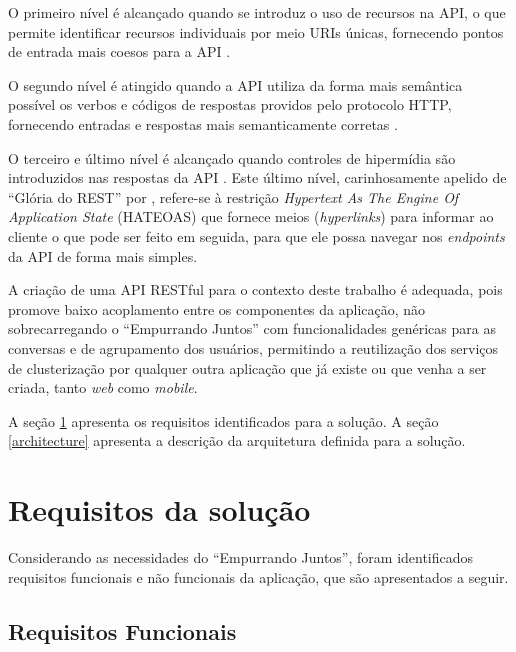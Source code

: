       O primeiro nível é alcançado quando se introduz o uso de recursos na API,
      o que permite identificar recursos individuais por meio URIs únicas,
      fornecendo pontos de entrada mais coesos para a API \cite{fowler10} \cite{richardson09}.
      
      O segundo nível é atingido quando a API utiliza da forma mais semântica possível
      os verbos e códigos de respostas providos pelo protocolo HTTP,
      fornecendo entradas e respostas mais semanticamente corretas \cite{fowler10} \cite{richardson09}.
      
      O terceiro e último nível é alcançado quando controles de hipermídia
      são introduzidos nas respostas da API \cite{fowler10} \cite{richardson09}.
      Este último nível, carinhosamente apelido de ``Glória do REST'' por ,
      refere-se à restrição \textit{Hypertext As The Engine Of Application State} (HATEOAS) 
      que fornece meios (\textit{hyperlinks}) para informar ao cliente o que pode ser feito em seguida,
      para que ele possa navegar nos \textit{endpoints} da API de forma mais simples.
      
  A criação de uma API RESTful para o contexto deste trabalho é adequada, pois promove baixo acoplamento
  entre os componentes da aplicação, não sobrecarregando o ``Empurrando Juntos'' com funcionalidades genéricas
  para as conversas e de agrupamento dos usuários,
  permitindo a reutilização dos serviços de clusterização por qualquer
  outra aplicação que já existe ou que venha a ser criada, tanto \textit{web} como \textit{mobile}.
  
  A seção \ref{requirements} apresenta os requisitos identificados para a solução.
  A seção \ref{architecture} apresenta a descrição da arquitetura definida para a solução.

\section{Requisitos da solução} \label{requirements}

    Considerando as necessidades do ``Empurrando Juntos'',
    foram identificados requisitos funcionais e não funcionais da aplicação,
    que são apresentados a seguir.

    \subsection*{Requisitos Funcionais} \label{functional_requirements}

